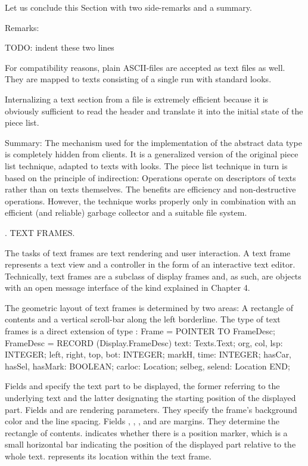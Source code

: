Let us conclude this Section with two side-remarks and a summary.

\noindent Remarks:

TODO: indent these two lines

For compatibility reasons, plain ASCII-files are accepted as text files as well. They are mapped to texts consisting of a single run with standard looks.

Internalizing a text section from a file is extremely efficient because it is obviously sufficient to read the header and translate it into the initial state of the piece list.

Summary: The mechanism used for the implementation of the abstract data type  is completely hidden from clients. It is a generalized version of the original piece list technique, adapted to texts with looks. The piece list technique in turn is based on the principle of indirection: Operations operate on descriptors of texts rather than on texts themselves. The benefits are efficiency and non-destructive operations. However, the technique works properly only in combination with an efficient (and reliable) garbage collector and a suitable file system.

. TEXT FRAMES.

The tasks of text frames are text rendering and user interaction. A text frame represents a text view and a controller in the form of an interactive text editor. Technically, text frames are a subclass of display frames and, as such, are objects with an open message interface of the kind explained in Chapter 4.

The geometric layout of text frames is determined by two areas: A rectangle of contents and a vertical scroll-bar along the left borderline. The type of text frames is a direct extension of type :
\begintt
Frame = POINTER TO FrameDesc;
FrameDesc = RECORD (Display.FrameDesc)
  text: Texts.Text;
  org, col, lsp: INTEGER;
  left, right, top, bot: INTEGER;
  markH, time: INTEGER;
  hasCar, hasSel, hasMark: BOOLEAN;
  carloc: Location;
  selbeg, selend: Location
END;
\endtt

\noindent Fields  and  specify the text part to be displayed, the former referring to the underlying text and the latter designating the starting position of the displayed part. Fields  and  are rendering parameters. They specify the frame's background color and the line spacing. Fields , , , and  are margins. They determine the rectangle of contents.  indicates whether there is a position marker, which is a small horizontal bar indicating the position of the displayed part relative to the whole text.  represents its location within the text frame.

